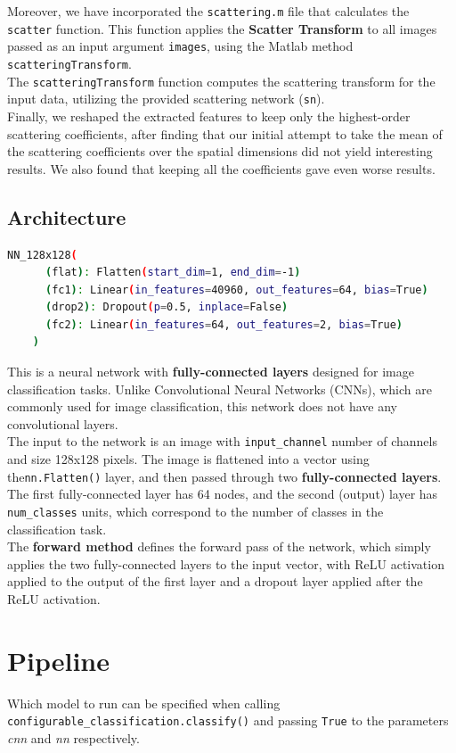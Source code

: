 \documentclass{report}
\begin{document}
Moreover, we have incorporated the \texttt{scattering.m} file that calculates the \texttt{scatter} function. This function applies the 
\textbf{Scatter Transform} to all images passed as an input argument \texttt{images}, using the Matlab method \texttt{scatteringTransform}. \\
The \texttt{scatteringTransform} function computes the scattering transform for the input data, utilizing the provided scattering network 
(\texttt{sn}).\\

Finally, we reshaped the extracted features to keep only the highest-order scattering coefficients, after finding that our initial attempt 
to take the mean of the scattering coefficients over the spatial dimensions did not yield interesting results. We also found that keeping 
all the coefficients gave even worse results.


\subsection{Architecture}
\begin{lstlisting}[language=bash]
    NN_128x128(
      (flat): Flatten(start_dim=1, end_dim=-1)
      (fc1): Linear(in_features=40960, out_features=64, bias=True)
      (drop2): Dropout(p=0.5, inplace=False)
      (fc2): Linear(in_features=64, out_features=2, bias=True)
    )
    \end{lstlisting}
This is a neural network with \textbf{fully-connected layers} designed for image classification tasks. Unlike Convolutional Neural Networks (CNNs), 
which are commonly used for image classification, this network does not have any convolutional layers. \\
The input to the network is an image with \texttt{input\_channel} number of channels and size 128x128 pixels. The image is flattened into a vector 
using the\texttt{nn.Flatten()} layer, and then passed through two \textbf{fully-connected layers}. The first fully-connected layer has 64 nodes, 
and the second (output) layer has \texttt{num\_classes} units, which correspond to the number of classes in the classification task.\\

The \textbf{forward method} defines the forward pass of the network, which simply applies the two fully-connected layers to the input vector, with ReLU activation applied to the output of the first layer and a dropout layer applied after the ReLU activation.

\section{Pipeline}
Which model to run can be specified when calling \texttt{configurable\_classification.classify()} and passing \texttt{True} to
the parameters \textit{cnn} and \textit{nn} respectively.\\
\end{document}
